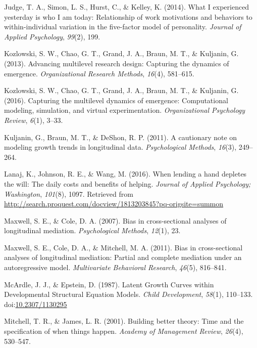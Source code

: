 \documentclass[english,,man]{apa6}
\theoremstyle{definition}
\theoremstyle{definition}
\theoremstyle{definition}
\theoremstyle{remark}
\begin{document}
\leavevmode\hypertarget{ref-judge_what_2014}{}%
Judge, T. A., Simon, L. S., Hurst, C., \& Kelley, K. (2014). What I
experienced yesterday is who I am today: Relationship of work
motivations and behaviors to within-individual variation in the
five-factor model of personality. \emph{Journal of Applied Psychology},
\emph{99}(2), 199.

\leavevmode\hypertarget{ref-kozlowski_advancing_2013}{}%
Kozlowski, S. W., Chao, G. T., Grand, J. A., Braun, M. T., \& Kuljanin,
G. (2013). Advancing multilevel research design: Capturing the dynamics
of emergence. \emph{Organizational Research Methods}, \emph{16}(4),
581--615.

\leavevmode\hypertarget{ref-kozlowski_capturing_2016}{}%
Kozlowski, S. W., Chao, G. T., Grand, J. A., Braun, M. T., \& Kuljanin,
G. (2016). Capturing the multilevel dynamics of emergence: Computational
modeling, simulation, and virtual experimentation. \emph{Organizational
Psychology Review}, \emph{6}(1), 3--33.

\leavevmode\hypertarget{ref-kuljanin2011cautionary}{}%
Kuljanin, G., Braun, M. T., \& DeShon, R. P. (2011). A cautionary note
on modeling growth trends in longitudinal data. \emph{Psychological
Methods}, \emph{16}(3), 249--264.

\leavevmode\hypertarget{ref-lanaj_when_2016}{}%
Lanaj, K., Johnson, R. E., \& Wang, M. (2016). When lending a hand
depletes the will: The daily costs and benefits of helping.
\emph{Journal of Applied Psychology; Washington}, \emph{101}(8), 1097.
Retrieved from
\url{http://search.proquest.com/docview/1813203845?pq-origsite=summon}

\leavevmode\hypertarget{ref-maxwell2007bias}{}%
Maxwell, S. E., \& Cole, D. A. (2007). Bias in cross-sectional analyses
of longitudinal mediation. \emph{Psychological Methods}, \emph{12}(1),
23.

\leavevmode\hypertarget{ref-maxwell2011bias}{}%
Maxwell, S. E., Cole, D. A., \& Mitchell, M. A. (2011). Bias in
cross-sectional analyses of longitudinal mediation: Partial and complete
mediation under an autoregressive model. \emph{Multivariate Behavioral
Research}, \emph{46}(5), 816--841.

\leavevmode\hypertarget{ref-mcardle_latent_1987}{}%
McArdle, J. J., \& Epstein, D. (1987). Latent Growth Curves within
Developmental Structural Equation Models. \emph{Child Development},
\emph{58}(1), 110--133.
doi:\href{https://doi.org/10.2307/1130295}{10.2307/1130295}

\leavevmode\hypertarget{ref-mitchell_building_2001}{}%
Mitchell, T. R., \& James, L. R. (2001). Building better theory: Time
and the specification of when things happen. \emph{Academy of Management
Review}, \emph{26}(4), 530--547.
\end{document}
